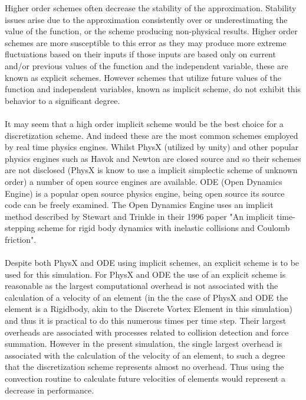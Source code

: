 Higher order schemes often decrease the stability of the approximation. Stability issues arise due to the approximation consistently over or underestimating the value of the function, or the scheme producing non-physical results. Higher order schemes are more susceptible to this error as they may produce more extreme fluctuations based on their inputs if those inputs are based only on current and/or previous values of the function and the independent variable, these are known as explicit schemes. However schemes that utilize future values of the function and independent variables, known as implicit scheme, do not exhibit this behavior to a significant degree. 
\\\\
It may seem that a high order implicit scheme would be the best choice for a discretization scheme. And indeed these are the most common schemes employed by real time physics engines. Whilst PhysX (utilized by unity) and other popular physics engines such as Havok and Newton are closed source and so their schemes are not disclosed (PhysX is know to use a implicit simplectic scheme of unknown order) a number of open source engines are available. ODE (Open Dynamics Engine) is a popular open source physics engine, being open source its source code can be freely examined. The Open Dynamics Engine uses an implicit method described by Stewart and Trinkle in their 1996 paper "An implicit time-stepping scheme for rigid body dynamics with inelastic collisions and Coulomb friction".
\\\\
Despite both PhysX and ODE using implicit schemes, an explicit scheme is to be used for this simulation. For PhysX and ODE the use of an explicit scheme is reasonable as the largest computational overhead is not associated with the calculation of a velocity of an element (in the the case of PhysX and ODE the element is a Rigidbody, akin to the Discrete Vortex Element in this simulation) and thus it is practical to do this numerous times per time step. Their largest overheads are associated with processes related to collision detection and force summation. However in the present simulation, the single largest overhead is associated with the calculation of the velocity of an element, to such a degree that the discretization scheme represents almost no overhead. Thus using the convection routine to calculate future velocities of elements would represent a decrease in performance.
\\\\
